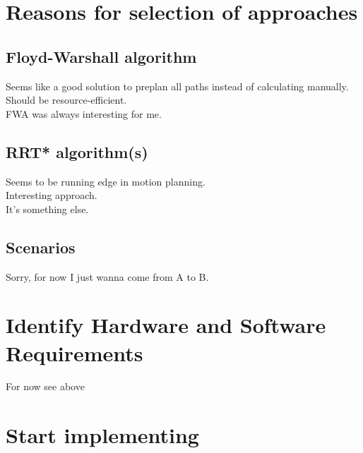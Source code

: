 \documentclass[11pt,a4paper]{article}
\begin{document}


\section{Reasons for selection of approaches}
\subsection{Floyd-Warshall algorithm}
Seems like a good solution to preplan all paths instead of calculating manually.\\
Should be resource-efficient.\\
FWA was always interesting for me.
\subsection{RRT* algorithm(s)}
Seems to be running edge in motion planning.\\
Interesting approach. \\
It's something else.
\subsection{Scenarios}
Sorry, for now I just wanna come from A to B.
\section{Identify Hardware and Software Requirements}
For now see above
\section{Start implementing}
\end{document}
